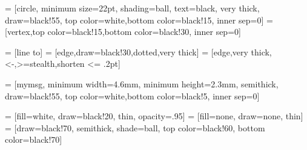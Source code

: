 

 = [circle, minimum size=22pt, shading=ball, text=black, very thick, draw=black!55, top color=white,bottom color=black!15, inner sep=0]
 = [vertex,top color=black!15,bottom color=black!30, inner sep=0]

 = [line to]
 = [edge,draw=black!30,dotted,very thick]
 = [edge,very thick,<-,>=stealth,shorten <= .2pt]


\makeatletter


 = [mymsg, minimum width=4.6mm, minimum height=2.3mm, semithick, draw=black!55, top color=white,bottom color=black!5, inner sep=0]

 =  [fill=white, draw=black!20, thin, opacity=.95]
 = [fill=none, draw=none, thin]
 =   [draw=black!70, semithick, shade=ball, top color=black!60, bottom color=black!70]

